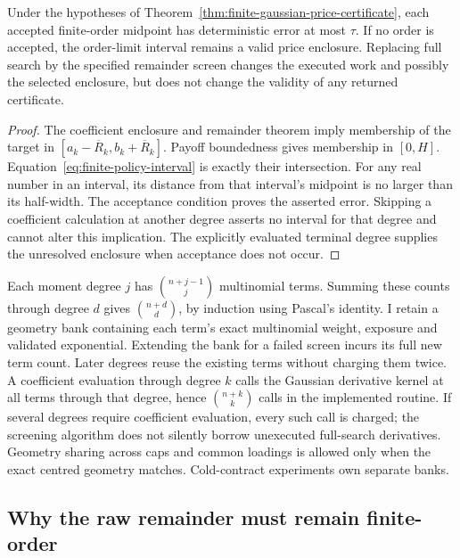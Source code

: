 \begin{proposition}
\label{prop:finite-certificate-selection}
Under the hypotheses of Theorem~\ref{thm:finite-gaussian-price-certificate},
each accepted finite-order midpoint has deterministic error at most $\tau$.
If no order is accepted, the order-limit interval remains a valid price
enclosure. Replacing full search by the specified remainder screen changes
the executed work and possibly the selected enclosure, but does not change
the validity of any returned certificate.
\end{proposition}
\begin{proof}
The coefficient enclosure and remainder theorem imply membership of the
target in $[a_k-\overline R_k,b_k+\overline R_k]$. Payoff boundedness gives
membership in $[0,H]$. Equation~\eqref{eq:finite-policy-interval} is exactly
their intersection. For any real number in an interval, its distance from
that interval's midpoint is no larger than its half-width. The acceptance
condition proves the asserted error. Skipping a coefficient calculation
at another degree asserts no interval for that degree and cannot alter
this implication. The explicitly evaluated terminal degree supplies the
unresolved enclosure when acceptance does not occur.
\end{proof}

Each moment degree $j$ has $\binom{n+j-1}{j}$ multinomial terms. Summing
these counts through degree $d$ gives $\binom{n+d}{d}$, by induction using
Pascal's identity. I retain a geometry bank containing each term's exact
multinomial weight, exposure and validated exponential. Extending the bank
for a failed screen incurs its full new term count. Later degrees reuse
the existing terms without charging them twice. A coefficient evaluation
through degree $k$ calls the Gaussian derivative kernel at all terms
through that degree, hence $\binom{n+k}{k}$ calls in the implemented
routine. If several degrees require coefficient evaluation, every such
call is charged; the screening algorithm does not silently borrow
unexecuted full-search derivatives. Geometry sharing across caps and
common loadings is allowed only when the exact centred geometry matches.
Cold-contract experiments own separate banks.

\subsection{Why the raw remainder must remain finite-order}

